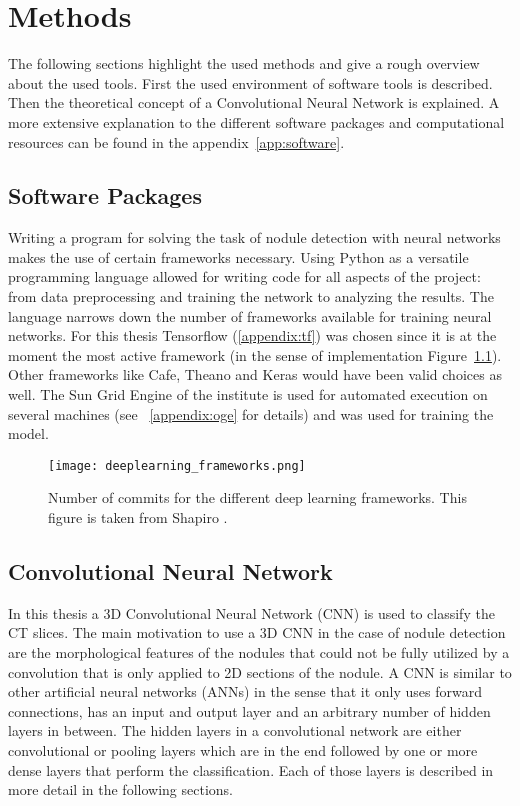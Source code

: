 \documentclass[main.tex]{subfiles}
\begin{document}
\chapter{Methods}\label{chap:methods}
The following sections highlight the used methods and give a rough overview about the used tools. First the used environment of software tools is described. Then the theoretical concept of a Convolutional Neural Network is explained. A more extensive explanation to the different software packages and computational resources can be found in the appendix~\ref{app:software}.

\section{Software Packages}
Writing a program for solving the task of nodule detection with neural networks makes the use of certain frameworks necessary. Using Python as a versatile programming language allowed for writing code for all aspects of the project: from data preprocessing and training the network to analyzing the results. The language narrows down the number of frameworks available for training neural networks. For this thesis Tensorflow (\ref{appendix:tf}) was chosen since it is at the moment the most active framework (in the sense of implementation  Figure~\ref{fig:frameworks}). Other frameworks like Cafe, Theano and Keras would have been valid choices as well. The Sun Grid Engine of the institute is used for automated execution on several machines (see ~\ref{appendix:oge} for details) and was used for training the model.

\begin{figure}
\begin{center}
\texttt{[image: deeplearning\_frameworks.png]}
\end{center}
\caption{Number of commits for the different deep learning frameworks. This figure is taken from Shapiro \cite{shapiro2017}.}
\label{fig:frameworks}
\end{figure}


\section{Convolutional Neural Network}
In this thesis a 3D Convolutional Neural Network (CNN) is used to classify the CT slices. The main motivation to use a 3D CNN in the case of nodule detection are the morphological features of the nodules that could not be fully utilized by a convolution that is only applied to 2D sections of the nodule. A CNN is similar to other artificial neural networks (ANNs) in the sense that it only uses forward connections, has an input and output layer and an arbitrary number of hidden layers in between. The hidden layers in a convolutional network are either convolutional or pooling layers which are in the end followed by one or more dense layers that perform the classification. Each of those layers is described in more detail in the following sections.
\end{document}
